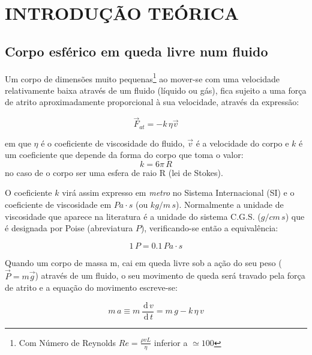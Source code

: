 \documentclass[a4paper,twoside,12pt]{article}      %
\newcommand{\ud}{\,\mathrm{d}}
\begin{document}
\section{\sf INTRODUÇÃO TEÓRICA}
\subsection{\sf Corpo esférico em queda livre num fluido}
Um corpo de dimensões muito pequenas\footnote{Com Número de Reynolds $Re= \frac{\rho v L}{\eta}$ inferior a $\simeq 100$}  ao mover-se com uma velocidade relativamente baixa através de um fluido (líquido ou gás), fica sujeito a uma força de atrito aproximadamente proporcional à sua velocidade, através da expressão:

\begin{equation}
	\label{eq:f_atrito}
	\vec{F}_{at} = - k \, \eta \vec{v}
\end{equation}

em que $\eta$ é o coeficiente de viscosidade do fluido, $\vec{v}$ é a velocidade do corpo e $k$ é um coeficiente que depende da forma do corpo  que toma o valor: 
\begin{equation}
	\label{eq:coef_atrito}
	k = 6 \pi \, R
\end{equation}
no caso de o corpo ser uma esfera de raio R (lei de Stokes).

O coeficiente $k$ virá assim expresso em \emph{metro} no Sistema Internacional (SI) e o coeficiente de viscosidade em $Pa\cdot s$ (ou $kg/m\,s$).
Normalmente a unidade de viscosidade que aparece na literatura é a unidade do sistema C.G.S. ($g/cm\,s$) que é designada por Poise (abreviatura $P$), verificando-se então a equivalência:

\begin{equation*}
	1 \, P = 0.1\, Pa\cdot s
\end{equation*}

Quando um corpo de massa m, cai em queda livre sob a ação do seu peso ($\vec{P}=m\vec{g}$) através de um fluido, o seu movimento de queda será travado pela força de atrito e a equação do movimento escreve-se:

\begin{equation}
	\label{eq:mov}
	m\,a \equiv m\, \frac{\ud\, v}{\ud\, t} =  m\,g - k  \, \eta \, v
\end{equation}
\end{document}
